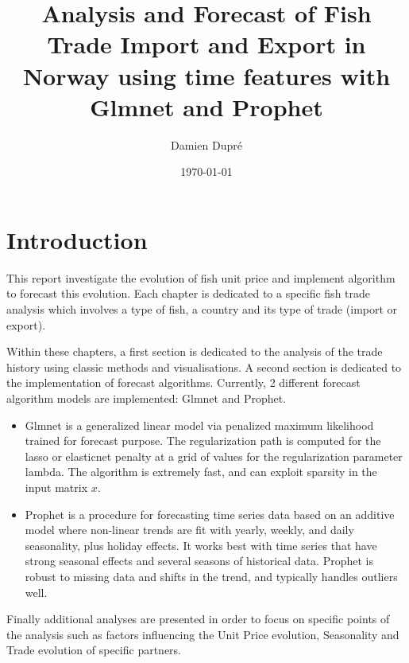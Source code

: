 \documentclass[10,a4paperpaper,]{article}
\title{Analysis and Forecast of Fish Trade Import and Export \break in
Norway using time features with Glmnet and Prophet}
\author{Damien Dupré}
\date{\today}
\begin{document}
\renewcommand{\contentsname}{Analysis and Forecast of Fish Trade Import and Export in Norway}

\renewcommand{\pagename}{Page}


\maketitle
\tableofcontents
{}
\clearpage
\justifying

\section{Introduction}

This report investigate the evolution of fish unit price and implement
algorithm to forecast this evolution. Each chapter is dedicated to a
specific fish trade analysis which involves a type of fish, a country
and its type of trade (import or export).

Within these chapters, a first section is dedicated to the analysis of
the trade history using classic methods and visualisations. A second
section is dedicated to the implementation of forecast algorithms.
Currently, 2 different forecast algorithm models are implemented: Glmnet
and Prophet.

\begin{itemize}
\item
  Glmnet is a generalized linear model via penalized maximum likelihood
  trained for forecast purpose. The regularization path is computed for
  the lasso or elasticnet penalty at a grid of values for the
  regularization parameter lambda. The algorithm is extremely fast, and
  can exploit sparsity in the input matrix \(x\).
\item
  Prophet is a procedure for forecasting time series data based on an
  additive model where non-linear trends are fit with yearly, weekly,
  and daily seasonality, plus holiday effects. It works best with time
  series that have strong seasonal effects and several seasons of
  historical data. Prophet is robust to missing data and shifts in the
  trend, and typically handles outliers well.
\end{itemize}

Finally additional analyses are presented in order to focus on specific
points of the analysis such as factors influencing the Unit Price
evolution, Seasonality and Trade evolution of specific partners.

\clearpage
\end{document}
